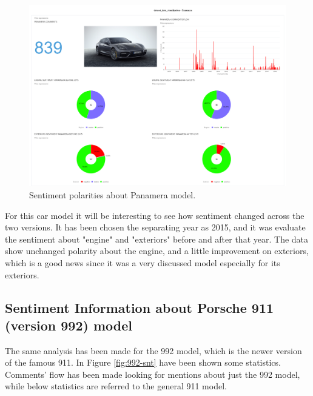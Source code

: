 \begin{figure}[H]
	\centering
	\includegraphics[width=\textwidth]{figures/odv_export/dataset_data_visualization_2.pdf}
	\caption{Sentiment polarities about Panamera model.}
	\label{fig:panamera-snt}
\end{figure}

For this car model it will be interesting to see how sentiment changed across the two versions. It has been chosen the separating year as 2015, and it was evaluate the sentiment about "engine" and "exteriors" before and after that year. The data show unchanged polarity about the engine, and a little improvement on exteriors, which is a good news since it was a very discussed model especially for its exteriors.



\subsection{Sentiment Information about Porsche 911 (version 992) model}

The same analysis has been made for the 992 model, which is the newer version of the famous 911. In Figure \ref{fig:992-snt} have been shown some statistics. Comments' flow has been made looking for mentions about just the 992 model, while below statistics are referred to the general 911 model.

